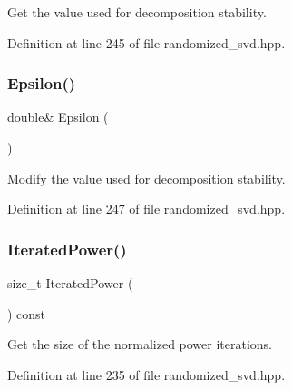Get the value used for decomposition stability. 



Definition at line 245 of file randomized\+\_\+svd.\+hpp.

\mbox{\label{classmlpack_1_1svd_1_1RandomizedSVD_ab6a080993b32456443eced5df2f8b9b9}} 
\subsubsection{Epsilon()\hspace{0.1cm}{\footnotesize\ttfamily [2/2]}}
{\footnotesize\ttfamily double\& Epsilon (\begin{DoxyParamCaption}{ }\end{DoxyParamCaption})\hspace{0.3cm}{\ttfamily [inline]}}



Modify the value used for decomposition stability. 



Definition at line 247 of file randomized\+\_\+svd.\+hpp.

\mbox{\label{classmlpack_1_1svd_1_1RandomizedSVD_aa8e59edf3732bcceec0a214f9d049488}} 
\subsubsection{Iterated\+Power()\hspace{0.1cm}{\footnotesize\ttfamily [1/2]}}
{\footnotesize\ttfamily size\+\_\+t Iterated\+Power (\begin{DoxyParamCaption}{ }\end{DoxyParamCaption}) const\hspace{0.3cm}{\ttfamily [inline]}}



Get the size of the normalized power iterations. 



Definition at line 235 of file randomized\+\_\+svd.\+hpp.

\mbox{\label{classmlpack_1_1svd_1_1RandomizedSVD_aa06eded3fc0ec2f6bae88acc0395da57}} 
